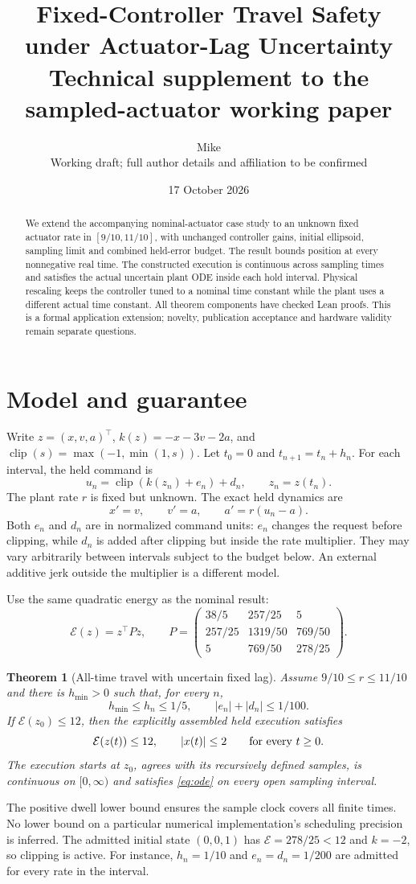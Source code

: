 \documentclass[10pt]{article}
\title{Fixed-Controller Travel Safety\\under Actuator-Lag Uncertainty\\[4pt]
\large Technical supplement to the sampled-actuator working paper}
\author{Mike\\\small Working draft; full author details and affiliation to be confirmed}
\date{17 October 2026}
\newtheorem{theorem}{Theorem}
\newcommand{\E}{\mathcal E}
\newcommand{\clip}{\operatorname{clip}}
\begin{document}
\maketitle
\begin{abstract}
We extend the accompanying nominal-actuator case study to an unknown fixed actuator rate in $[9/10,11/10]$, with unchanged controller gains, initial ellipsoid, sampling limit and combined held-error budget. The result bounds position at every nonnegative real time. The constructed execution is continuous across sampling times and satisfies the actual uncertain plant ODE inside each hold interval. Physical rescaling keeps the controller tuned to a nominal time constant while the plant uses a different actual time constant. All theorem components have checked Lean proofs. This is a formal application extension; novelty, publication acceptance and hardware validity remain separate questions.
\end{abstract}

\section{Model and guarantee}
Write $z=(x,v,a)^\top$, $k(z)=-x-3v-2a$, and
$\clip(s)=\max(-1,\min(1,s))$. Let $t_0=0$ and $t_{n+1}=t_n+h_n$.
For each interval, the held command is
\[
 u_n=\clip(k(z_n)+e_n)+d_n,\qquad z_n=z(t_n).
\]
The plant rate $r$ is fixed but unknown. The exact held dynamics are
\begin{equation}\label{eq:ode}
 x'=v,\qquad v'=a,\qquad a'=r(u_n-a).
\end{equation}
Both $e_n$ and $d_n$ are in normalized command units: $e_n$ changes the request before clipping, while $d_n$ is added after clipping but inside the rate multiplier. They may vary arbitrarily between intervals subject to the budget below. An external additive jerk outside the multiplier is a different model.

Use the same quadratic energy as the nominal result:
\[
 \E(z)=z^\top Pz,\qquad
 P=\begin{pmatrix}
 38/5&257/25&5\\
 257/25&1319/50&769/50\\
 5&769/50&278/25
 \end{pmatrix}.
\]
\begin{theorem}[All-time travel with uncertain fixed lag]\label{thm:main}
Assume $9/10\le r\le11/10$ and there is $h_{\min}>0$ such that, for every $n$,
\[
 h_{\min}\le h_n\le1/5,\qquad |e_n|+|d_n|\le1/100.
\]
If $\E(z_0)\le12$, then the explicitly assembled held execution satisfies
\[
 \E(z(t))\le12,\qquad |x(t)|\le2\qquad\hbox{for every }t\ge0.
\]
The execution starts at $z_0$, agrees with its recursively defined samples, is continuous on $[0,\infty)$ and satisfies \eqref{eq:ode} on every open sampling interval.
\end{theorem}
The positive dwell lower bound ensures the sample clock covers all finite times.
No lower bound on a particular numerical implementation's scheduling precision is inferred.
The admitted initial state $(0,0,1)$ has $\E=278/25<12$ and $k=-2$, so clipping is active.
For instance, $h_n=1/10$ and $e_n=d_n=1/200$ are admitted for every rate in the interval.
\end{document}
